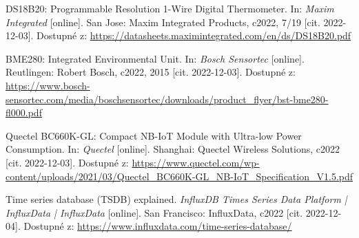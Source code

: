 \begin{thebibliography}{99}
DS18B20: Programmable Resolution 1-Wire Digital Thermometer. In: \textit{Maxim Integrated} [online]. San Jose: Maxim Integrated Products, c2022, 7/19 [cit. 2022-12-03]. Dostupné z: \url{https://datasheets.maximintegrated.com/en/ds/DS18B20.pdf}

BME280: Integrated Environmental Unit. In: \textit{Bosch Sensortec} [online]. Reutlingen: Robert Bosch, c2022, 2015 [cit. 2022-12-03]. Dostupné z: \url{https://www.bosch-sensortec.com/media/boschsensortec/downloads/product\_flyer/bst-bme280-fl000.pdf}

Quectel BC660K-GL: Compact NB-IoT Module with Ultra-low Power Consumption. In: \textit{Quectel} [online]. Shanghai: Quectel Wireless Solutions, c2022 [cit. 2022-12-03]. Dostupné z: \url{https://www.quectel.com/wp-content/uploads/2021/03/Quectel\_BC660K-GL\_NB-IoT\_Specification\_V1.5.pdf}

Time series database (TSDB) explained. \textit{InfluxDB Times Series Data Platform | InfluxData | InfluxData} [online]. San Francisco: InfluxData, c2022 [cit. 2022-12-04]. Dostupné z: \url{https://www.influxdata.com/time-series-database/}


\end{thebibliography}


%
%
%
